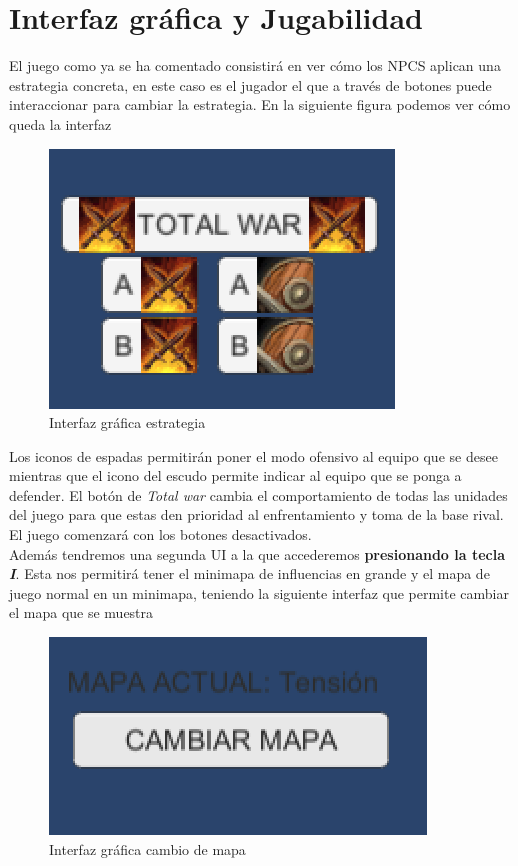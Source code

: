 \section{Interfaz gráfica y Jugabilidad}
El juego como ya se ha comentado consistirá en ver cómo los NPCS aplican una estrategia concreta, en este caso es el jugador el que a través de botones puede interaccionar para cambiar la estrategia. En la siguiente figura podemos ver cómo queda la interfaz
\begin{figure}[H]
    \centering
    \includegraphics{buttons1.png}
    \caption{Interfaz gráfica estrategia}
    \label{fig:mainButtons}
\end{figure}
Los iconos de espadas permitirán poner el modo ofensivo al equipo que se desee mientras que el icono del escudo permite indicar al equipo que se ponga a defender. El botón de \textit{Total war} cambia el comportamiento de todas las unidades del juego para que estas den prioridad al enfrentamiento y toma de la base rival. El juego comenzará con los botones desactivados. \\

Además tendremos una segunda UI a la que accederemos \textbf{presionando la tecla \textit{I}}. Esta nos permitirá tener el minimapa de influencias en grande y el mapa de juego normal en un minimapa, teniendo la siguiente interfaz que permite cambiar el mapa que se muestra \begin{figure}[H]
    \centering
    \includegraphics{buttons2.png}
    \caption{Interfaz gráfica cambio de mapa}
    \label{fig:mainButtons}
\end{figure}

